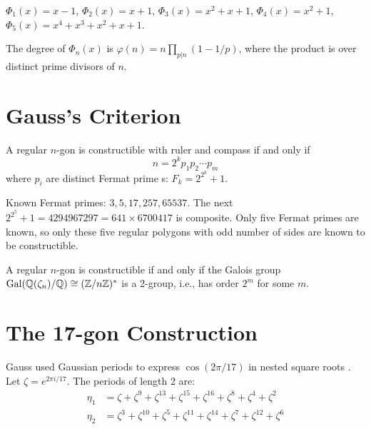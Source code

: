 \begin{example}
$\Phi_1(x) = x - 1$, $\Phi_2(x) = x + 1$, $\Phi_3(x) = x^2 + x + 1$, $\Phi_4(x) = x^2 + 1$, $\Phi_5(x) = x^4 + x^3 + x^2 + x + 1$.
\end{example}

\begin{theorem}
The degree of $\Phi_n(x)$ is $\varphi(n) = n\prod_{p|n}(1-1/p)$, where the product is over distinct prime divisors of $n$.
\end{theorem}

\section{Gauss's Criterion}

\begin{theorem}
A regular $n$-gon is constructible with ruler and compass if and only if
\[
n = 2^k p_1 p_2 \cdots p_m
\]
where $p_i$ are distinct Fermat prime s: $F_k = 2^{2^k} + 1$.
\end{theorem}

Known Fermat primes: $3, 5, 17, 257, 65537$. The next $2^{2^5}+1 = 4294967297 = 641 \times 6700417$ is composite. Only five Fermat primes are known, so only these five regular polygons with odd number of sides are known to be constructible.

\begin{theorem}
A regular $n$-gon is constructible if and only if the Galois group $\operatorname{Gal}(\mathbb{Q}(\zeta_n)/\mathbb{Q}) \cong (\mathbb{Z}/n\mathbb{Z})^*$ is a 2-group, i.e., has order $2^m$ for some $m$.
\end{theorem}

\section{The 17-gon Construction}

Gauss used Gaussian periods to express $\cos(2\pi/17)$ in nested square roots . Let $\zeta = e^{2\pi i/17}$. The periods of length 2 are:
\begin{align*}
\eta_1 &= \zeta + \zeta^9 + \zeta^{13} + \zeta^{15} + \zeta^{16} + \zeta^8 + \zeta^4 + \zeta^2 \\
\eta_2 &= \zeta^3 + \zeta^{10} + \zeta^5 + \zeta^{11} + \zeta^{14} + \zeta^7 + \zeta^{12} + \zeta^6
\end{align*}

